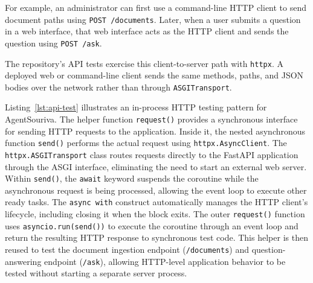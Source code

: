 For example, an administrator can first use a command-line HTTP client to send document paths using \texttt{POST\ /documents}. Later, when a user submits a question in a web interface, that web interface acts as the HTTP client and sends the question using \texttt{POST\ /ask}.


The repository's API tests exercise this client-to-server path with \texttt{httpx}. A deployed web or command-line client sends the same methods, paths, and JSON bodies over the network rather than through \texttt{ASGITransport}.

\noindent
Listing~\ref{lst:api-test} illustrates an in-process
HTTP testing pattern for AgentSouriva. The helper function
\texttt{request()} provides a synchronous interface for
sending HTTP requests to the application. Inside it, the
nested asynchronous function \texttt{send()} performs the
actual request using \texttt{httpx.AsyncClient}. The
\texttt{httpx.ASGITransport} class routes requests directly
to the FastAPI application through the ASGI interface,
eliminating the need to start an external web server.
Within \texttt{send()}, the \texttt{await} keyword suspends
the coroutine while the asynchronous request is being
processed, allowing the event loop to execute other ready
tasks. The \texttt{async with} construct automatically
manages the HTTP client's lifecycle, including closing it
when the block exits. The outer \texttt{request()} function
uses \texttt{asyncio.run(send())} to execute the coroutine
through an event loop and return the resulting HTTP response
to synchronous test code. This helper is then reused to
test the document ingestion endpoint (\texttt{/documents})
and question-answering endpoint (\texttt{/ask}), allowing
HTTP-level application behavior to be tested without
starting a separate server process.

